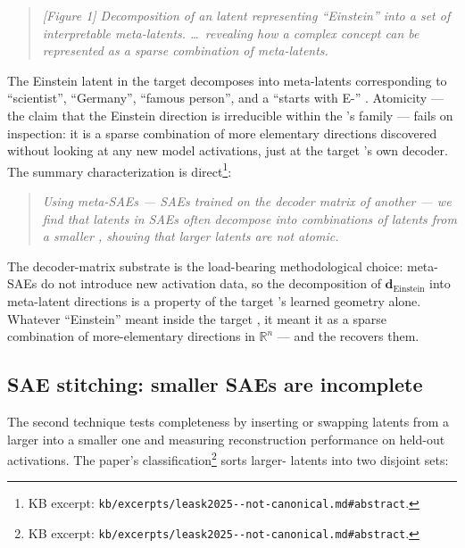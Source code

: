 \begin{quote}
\itshape
[Figure 1] Decomposition of an  latent representing ``Einstein''
into a set of interpretable meta-latents. \dots\ revealing how a
complex concept can be represented as a sparse combination of
meta-latents.~\citep[\S 1]{leask2025-sae-not-canonical}
\end{quote}

\noindent The Einstein latent in the target  decomposes into
meta-latents corresponding to ``scientist'', ``Germany'', ``famous
person'', and a ``starts with E-'' . Atomicity --- the claim
that the Einstein direction is irreducible within the 's 
family --- fails on inspection: it is a sparse combination of more
elementary directions discovered without looking at any new model
activations, just at the target 's own decoder. The summary
characterization is direct\footnote{KB excerpt:
\texttt{kb/excerpts/leask2025--not-canonical.md\#abstract}.}:

\begin{quote}
\itshape
Using meta-SAEs --- SAEs trained on the decoder matrix of another
 --- we find that latents in SAEs often decompose into
combinations of latents from a smaller , showing that larger 
latents are not atomic.~\citep[abstract]{leask2025-sae-not-canonical}
\end{quote}

\noindent The decoder-matrix substrate is the load-bearing methodological
choice: meta-SAEs do not introduce new activation data, so the
decomposition of $\mathbf{d}_\text{Einstein}$ into meta-latent
directions is a property of the target 's learned geometry alone.
Whatever ``Einstein'' meant inside the target , it meant it as a
sparse combination of more-elementary directions in
$\mathbb{R}^n$ --- and the  recovers them.

\subsection{SAE stitching: smaller SAEs are incomplete}
\label{sec:sae-stitching}

The second technique tests completeness by inserting or swapping
latents from a larger  into a smaller one and measuring
reconstruction performance on held-out activations. The paper's
classification\footnote{KB excerpt:
\texttt{kb/excerpts/leask2025--not-canonical.md\#abstract}.} sorts
larger- latents into two disjoint sets:

